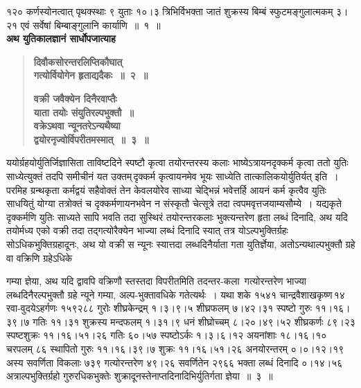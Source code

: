 \documentclass[11pt, openany]{book}
\begin{document}
\begin{sloppypar}
\noindent १२० कर्णस्योनत्वात् पृथक्स्थाः ९ युताः १०।३ त्रिभिर्विभक्ता जातं शुक्रस्य बिम्बं स्फुटमङ्गुलात्मकम् ३।२१ एवं सर्वेषां बिम्बाङ्गुलानि कार्याणि~॥~१~॥\\

{\small \textbf{अथ युतिकालज्ञानं सार्धोपजात्याह\textendash }}

 \label{8.2}
\begin{quote}
{\large \textbf{{\color{purple}दिवौकसोरन्तरलिप्तिकौघात् \\
गत्योर्वियोगेन हृताद्यदैकः~॥~२~॥}}
\vspace{1mm}

 \label{8.3}
\textbf{{\color{purple}वक्री जवैक्येन दिनैरवाप्तैः \\
याता तयोः संयुतिरल्पभुक्तौ~॥ \\
वक्रेऽथवा न्यूनतरेऽन्यथैष्या \\
द्वयोरनृज्वोर्विपरीतमस्मात्~॥~३~॥}}}
\end{quote}

ययोर्ग्रहयोर्युतिर्जिज्ञासिता ताविष्टदिने स्पष्टौ कृत्वा तयोरन्तरस्य कलाः भाष्येऽत्रायनदृक्कर्म कृत्वा ततो युतिः साध्येत्युक्तं तदपि समीचीनं यत उक्तम्\textendash \,{\color{violet}दृक्कर्म कृत्वायनमेव भूयः साध्येति तात्कालिकयोर्युतिर्यत्} इति~। परमिह ग्रन्थकृता कर्मद्वयं सहैवोक्तं तेन केवलयोरेव साध्या चेद्भिन्नं भवेत्तर्हि आयनं कर्म कृत्वैव युतिः साधयितुं योग्या तत्रोक्तं च दृक्कर्मणायनभवेन न संस्कृतौ चेत्सूत्रे तदा त्वपमवृत्तजयाम्यसौम्ये~। यद्यकृते दृक्कर्मणि युतिः साध्यते सापि भवति तदा सुस्थिरं तयोरन्तरकलाः भुक्त्यन्तरेण हृता लब्धं दिनादि, अथ यदि तयोर्मध्य एको वक्री तदा तद्गत्योरैक्येन भाज्या लब्धं दिनादि स्यात् तत्र योऽल्पभुक्तिर्ग्रहः सोऽधिकभुक्तिग्रहादूनः, अथ यो वक्री स न्यूनः स्यात्तदा लब्धदिनैर्याता गता युतिर्ज्ञेया, अतोऽन्यथाल्पभुक्तौ ग्रहे वा वक्रिणि ग्रहेऽधिके 
\end{sloppypar}

\newpage

\begin{sloppypar}
\noindent गम्या ज्ञेया, अथ यदि द्वावपि वक्रिणौ स्तस्तदा विपरीतमिति तदन्तर-कला~गत्योरन्तरेण भाज्या लब्धदिनैरल्पभुक्तौ ग्रहे न्यूने गम्या, अल्प-भुक्तावधिके गतेत्यर्थः~। यथा शके १५४१ चान्द्रवैशाखकृष्ण\textendash \,१४\textendash \,रवा-वुदयेऽहर्गणः १५९२८८ गुरोः शीघ्रकेन्द्रम् १।३।९।५ शीघ्रफलम् ७।४२।३१ स्पष्टो गुरुः ११।१६।३९।७ गतिः ११।३१ शुक्रस्य मन्दफलम् १।३१।९ धनं शीघ्रोच्चम् ८।२०।४९।५२ शीघ्रकर्णः ८९।२३ स्पष्टशुक्रः ११।१६।५१।२६ गतिः ६०।५७ स्पष्टोऽर्कः १।३।६।१२ अयनांशाः १८।१६।१० चरपलम् ८६ स्थापितो गुरुः ११।१६।३९।७ शुक्रः ११।१६।५१।२६ अनयोरन्तरम् ०।०।१२।१९ अस्य सवर्णिता विकलाः ७३९ गत्योरन्तरेण ४९।२६ सवर्णितेन २९६६ भक्ता लब्धं दिनादि ०।१४।५६ अत्राल्पभुक्तिर्ग्रहो गुरुरधिकभुक्तेः शुक्रादूनस्तेनाप्तदिनादिभिर्युतिर्गता ज्ञेया~॥~३~॥\\
\end{sloppypar}
\end{document}
